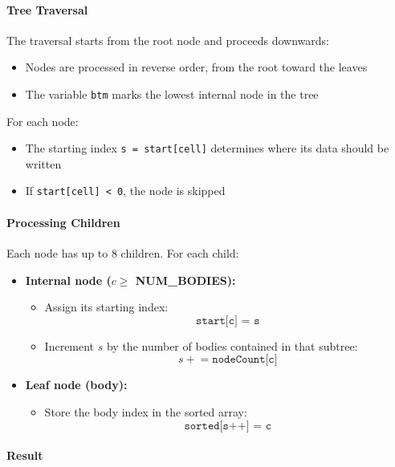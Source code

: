 \documentclass[12pt]{article}
\begin{document}
\paragraph{Tree Traversal}

The traversal starts from the root node and proceeds downwards:

\begin{itemize}
    \item Nodes are processed in reverse order, from the root toward the leaves
    \item The variable \texttt{btm} marks the lowest internal node in the tree
\end{itemize}

For each node:
\begin{itemize}
    \item The starting index \texttt{s = start[cell]} determines where its data should be written
    \item If \texttt{start[cell] < 0}, the node is skipped
\end{itemize}

\paragraph{Processing Children}

Each node has up to 8 children. For each child:

\begin{itemize}
    \item \textbf{Internal node ($c \geq$ NUM\_BODIES):}
    \begin{itemize}
        \item Assign its starting index:
        \[
        \texttt{start[c] = s}
        \]
        \item Increment $s$ by the number of bodies contained in that subtree:
        \[
        s \mathrel{+}= \texttt{nodeCount[c]}
        \]
    \end{itemize}

    \item \textbf{Leaf node (body):}
    \begin{itemize}
        \item Store the body index in the sorted array:
        \[
        \texttt{sorted[s++] = c}
        \]
    \end{itemize}
\end{itemize}

\paragraph{Result}
\end{document}
